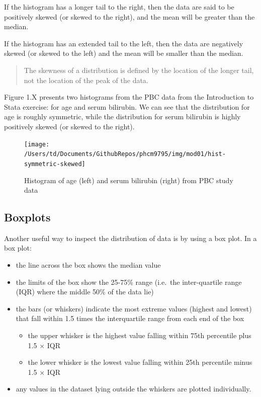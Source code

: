 \documentclass[
]{memoir}
\providecommand{\tightlist}{%
  \setlength{\itemsep}{0pt}\setlength{\parskip}{0pt}}
\begin{document}
If the histogram has a longer tail to the right, then the data are said to be positively skewed (or skewed to the right), and the mean will be greater than the median.

If the histogram has an extended tail to the left, then the data are negatively skewed (or skewed to the left) and the mean will be smaller than the median.

\begin{quote}
The skewness of a distribution is defined by the location of the longer tail, not the location of the peak of the data.
\end{quote}

Figure 1.X presents two histograms from the PBC data from the Introduction to Stata exercise: for age and serum bilirubin. We can see that the distribution for age is roughly symmetric, while the distribution for serum bilirubin is highly positively skewed (or skewed to the right).

\begin{figure}
\texttt{[image: /Users/td/Documents/GithubRepos/phcm9795/img/mod01/hist-symmetric-skewed]} \caption{Histogram of age (left) and serum bilirubin (right) from PBC study data}\label{fig:fig-1-6}
\end{figure}

\hypertarget{boxplots}{%
\subsection{Boxplots}\label{boxplots}}

Another useful way to inspect the distribution of data is by using a box plot. In a box plot:

\begin{itemize}
\tightlist
\item
  the line across the box shows the median value
\item
  the limits of the box show the 25-75\% range (i.e.~the inter-quartile range (IQR) where the middle 50\% of the data lie)
\item
  the bars (or whiskers) indicate the most extreme values (highest and lowest) that fall within 1.5 times the interquartile range from each end of the box

  \begin{itemize}
  \tightlist
  \item
    the upper whisker is the highest value falling within 75th percentile plus 1.5 × IQR
  \item
    the lower whisker is the lowest value falling within 25th percentile minus 1.5 × IQR
  \end{itemize}
\item
  any values in the dataset lying outside the whiskers are plotted individually.
\end{itemize}
\end{document}
